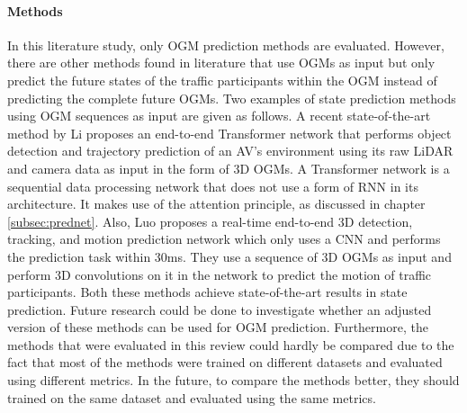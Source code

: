 \paragraph{Methods}
In this literature study, only \gls{OGM} prediction methods are evaluated. However, there are other methods found in literature that use \glspl{OGM} as input but only predict the future states of the traffic participants within the \gls{OGM} instead of predicting the complete future \glspl{OGM}. Two examples of state prediction methods using \gls{OGM} sequences as input are given as follows.
A recent state-of-the-art method by Li \cite{li2020end} proposes an end-to-end Transformer network that performs object detection and trajectory prediction of an \gls{AV}'s environment using its raw LiDAR and camera data as input in the form of 3D \glspl{OGM}. A Transformer network is a sequential data processing network that does not use a form of \gls{RNN} in its architecture. It makes use of the attention principle, as discussed in chapter \ref{subsec:prednet}.  Also, Luo \cite{luo2018fast} proposes a real-time end-to-end 3D detection, tracking, and motion prediction network which only uses a \gls{CNN} and performs the prediction task within 30ms. They use a sequence of 3D \glspl{OGM} as input and perform 3D convolutions on it in the network to predict the motion of traffic participants. Both these methods achieve state-of-the-art results in state prediction. Future research could be done to investigate whether an adjusted version of these methods can be used for \gls{OGM} prediction.  
Furthermore, the methods that were evaluated in this review could hardly be compared due to the fact that most of the methods were trained on different datasets and evaluated using different metrics. In the future, to compare the methods better, they should trained on the same dataset and evaluated using the same metrics.  
